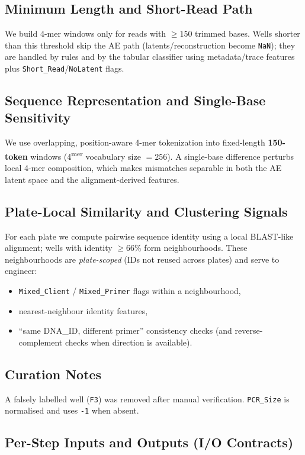 \subsection{Minimum Length and Short-Read Path}
We build 4-mer windows only for reads with $\geq 150$ trimmed bases. Wells shorter than this threshold skip the AE path (latents/reconstruction become \texttt{NaN}); they are handled by rules and by the tabular classifier using metadata/trace features plus \texttt{Short\_Read}/\texttt{NoLatent} flags.

\subsection{Sequence Representation and Single-Base Sensitivity}
We use overlapping, position-aware 4-mer tokenization into fixed-length \textbf{150-token} windows (4\textsuperscript{mer} vocabulary size $=256$). A single-base difference perturbs local 4-mer composition, which makes mismatches separable in both the AE latent space and the alignment-derived features.

\subsection{Plate-Local Similarity and Clustering Signals}
For each plate we compute pairwise sequence identity using a local BLAST-like alignment; wells with identity $\geq 66\%$ form neighbourhoods. These neighbourhoods are \emph{plate-scoped} (IDs not reused across plates) and serve to engineer:
\begin{itemize}
  \item \texttt{Mixed\_Client} / \texttt{Mixed\_Primer} flags within a neighbourhood,
  \item nearest-neighbour identity features,
  \item ``same DNA\_ID, different primer'' consistency checks (and reverse-complement checks when direction is available).
\end{itemize}

\subsection{Curation Notes}
A falsely labelled well (\texttt{F3}) was removed after manual verification. \texttt{PCR\_Size} is normalised and uses \texttt{-1} when absent.

\subsection{Per-Step Inputs and Outputs (I/O Contracts)}
\label{sec:io_contracts}

